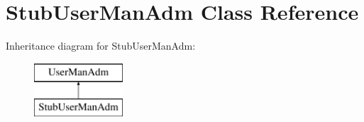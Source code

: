 \hypertarget{classStubUserManAdm}{\section{Stub\-User\-Man\-Adm Class Reference}
\label{dd/dfd/classStubUserManAdm}
}
Inheritance diagram for Stub\-User\-Man\-Adm\-:\begin{figure}[H]
\begin{center}
\leavevmode
\includegraphics[height=2.000000cm]{dd/dfd/classStubUserManAdm}
\end{center}
\end{figure}
